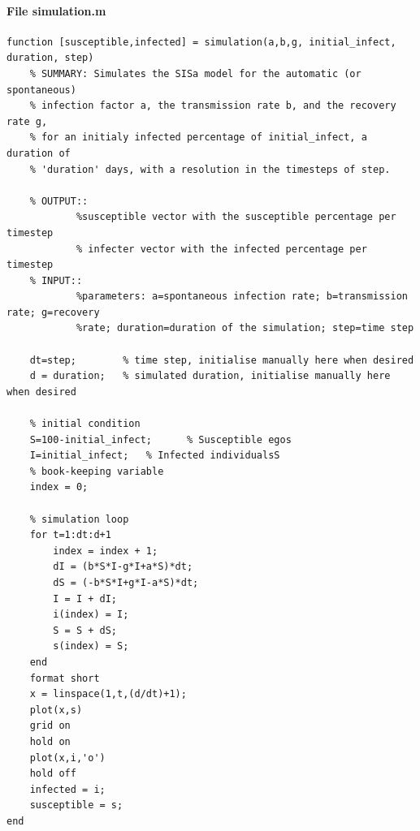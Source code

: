 \documentclass[11pt]{article}
\begin{document}
\paragraph{File simulation.m}
\begin{verbatim}
function [susceptible,infected] = simulation(a,b,g, initial_infect, duration, step)
    % SUMMARY: Simulates the SISa model for the automatic (or spontaneous)
    % infection factor a, the transmission rate b, and the recovery rate g,
    % for an initialy infected percentage of initial_infect, a duration of
    % 'duration' days, with a resolution in the timesteps of step.
    
    % OUTPUT::
            %susceptible vector with the susceptible percentage per timestep
            % infecter vector with the infected percentage per timestep
    % INPUT::
            %parameters: a=spontaneous infection rate; b=transmission rate; g=recovery
            %rate; duration=duration of the simulation; step=time step
            
    dt=step;        % time step, initialise manually here when desired
    d = duration;   % simulated duration, initialise manually here when desired

    % initial condition
    S=100-initial_infect;      % Susceptible egos
    I=initial_infect;   % Infected individualsS
    % book-keeping variable
    index = 0;

    % simulation loop
    for t=1:dt:d+1
        index = index + 1;
        dI = (b*S*I-g*I+a*S)*dt;
        dS = (-b*S*I+g*I-a*S)*dt;
        I = I + dI;
        i(index) = I;
        S = S + dS;
        s(index) = S;
    end
    format short
    x = linspace(1,t,(d/dt)+1);
    plot(x,s)
    grid on
    hold on
    plot(x,i,'o')
    hold off
    infected = i;
    susceptible = s;
end

\end{verbatim}
\end{document}
